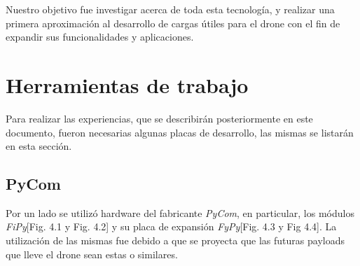 \documentclass[12pt]{article}
\begin{document}
Nuestro objetivo fue investigar acerca de toda esta tecnología, y realizar una primera aproximación al desarrollo de cargas útiles para el drone con el fin de expandir sus funcionalidades y aplicaciones.

\newpage
\section{Herramientas de trabajo}
\justifying
Para realizar las experiencias, que se describirán posteriormente en este documento, fueron necesarias algunas placas de desarrollo, las mismas se listarán en esta sección.
\subsection{PyCom}
Por un lado se utilizó hardware del fabricante \textit{PyCom}, en particular, los módulos \textit{FiPy}[Fig. 4.1 y Fig. 4.2] y su placa de expansión \textit{FyPy}[Fig. 4.3 y Fig 4.4]. La utilización de las mismas fue debido a que se proyecta que las futuras payloads que lleve el drone sean estas o similares.
\end{document}
